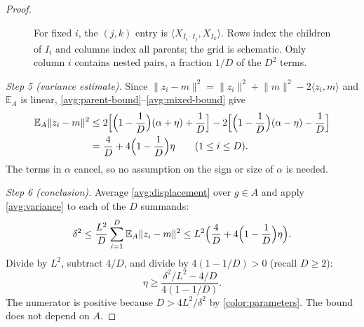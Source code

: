 \documentclass[11pt]{article}
\newcommand{\norm}[1]{\lVert #1\rVert}
\newcommand{\ip}[2]{\langle #1,#2\rangle}
\newcommand{\EA}{\mathbb E_A}
\theoremstyle{definition}
\numberwithin{equation}{section}
\begin{document}
\begin{proof}
\begin{figure}[tbp]
\centering
{}
\caption{For fixed \(i\), the \((j,k)\) entry is
\(\ip{X_{I_i\cdot I_j}}{X_{I_k}}\). Rows index the children of
\(I_i\) and columns index all parents; the grid is schematic.
Only column \(i\) contains nested pairs, a fraction \(1/D\) of the
\(D^2\) terms.}
\label{fig:mixed-pairs}
\end{figure}

\emph{Step 5 (variance estimate).} Since
\(\norm{z_i-m}^2=\norm{z_i}^2+\norm m^2-2\ip{z_i}{m}\) and \(\EA\) is
linear, \eqref{avg:parent-bound}--\eqref{avg:mixed-bound} give
\begin{align}
  \EA\norm{z_i-m}^2
  &\le 2\Bigl[\Bigl(1-\frac1D\Bigr)(\alpha+\eta)+\frac1D\Bigr]
      -2\Bigl[\Bigl(1-\frac1D\Bigr)(\alpha-\eta)-\frac1D\Bigr]\notag\\
  &=\frac4D+4\Bigl(1-\frac1D\Bigr)\eta
    \qquad(1\le i\le D).
    \label{avg:variance}
\end{align}
The terms in \(\alpha\) cancel, so no assumption on the sign or size of
\(\alpha\) is needed.

\emph{Step 6 (conclusion).} Average \eqref{avg:displacement} over
\(g\in A\) and apply \eqref{avg:variance} to each of the \(D\) summands:
\[
  \delta^2
  \le\frac{L^2}{D}\sum_{i=1}^D\EA\norm{z_i-m}^2
  \le L^2\Bigl(\frac4D+4\Bigl(1-\frac1D\Bigr)\eta\Bigr).
\]
Divide by \(L^2\), subtract \(4/D\), and divide by \(4(1-1/D)>0\)
(recall \(D\ge2\)):
\[
  \eta\ge\frac{\delta^2/L^2-4/D}{4(1-1/D)} .
\]
The numerator is positive because \(D>4L^2/\delta^2\) by
\eqref{color:parameters}. The bound does not depend on \(A\).
\end{proof}
\end{document}
